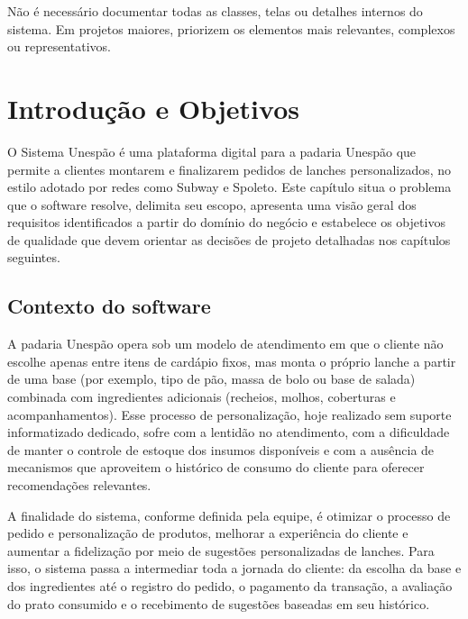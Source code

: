 \documentclass[a4paper,12pt,oneside,openany]{book}
\begin{document}
Não é necessário documentar todas as classes, telas ou detalhes internos do
sistema. Em projetos maiores, priorizem os elementos mais relevantes,
complexos ou representativos.

\clearpage
\fi

\chapter{Introdução e Objetivos}

O Sistema Unespão é uma plataforma digital para a padaria Unespão que permite a clientes montarem e finalizarem pedidos de lanches personalizados, no estilo adotado por redes como Subway e Spoleto. Este capítulo situa o problema que o software resolve, delimita seu escopo, apresenta uma visão geral dos requisitos identificados a partir do domínio do negócio e estabelece os objetivos de qualidade que devem orientar as decisões de projeto detalhadas nos capítulos seguintes.

\section{Contexto do software}

A padaria Unespão opera sob um modelo de atendimento em que o cliente não escolhe apenas entre itens de cardápio fixos, mas monta o próprio lanche a partir de uma base (por exemplo, tipo de pão, massa de bolo ou base de salada) combinada com ingredientes adicionais (recheios, molhos, coberturas e acompanhamentos). Esse processo de personalização, hoje realizado sem suporte informatizado dedicado, sofre com a lentidão no atendimento, com a dificuldade de manter o controle de estoque dos insumos disponíveis e com a ausência de mecanismos que aproveitem o histórico de consumo do cliente para oferecer recomendações relevantes.

A finalidade do sistema, conforme definida pela equipe, é otimizar o processo de pedido e personalização de produtos, melhorar a experiência do cliente e aumentar a fidelização por meio de sugestões personalizadas de lanches. Para isso, o sistema passa a intermediar toda a jornada do cliente: da escolha da base e dos ingredientes até o registro do pedido, o pagamento da transação, a avaliação do prato consumido e o recebimento de sugestões baseadas em seu histórico.
\end{document}
